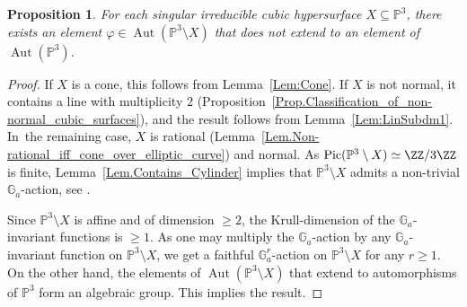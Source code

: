 \documentclass[JEP,XML,SOM,Unicode,NoFloatCountersInSection,published]{cedram}
\newtheorem{proposition}[lemma]{Proposition}
\theoremstyle{definition}
\newcommand\p{{\mathbb P}}\let\PP\p
\newcommand\GG{{\mathbb G}}
\DeclareMathOperator{\Aut}{Aut}
\DeclareMathOperator{\Pic}{Pic}
\begin{document}
\begin{proposition}\label{Prop:SingCubic}
For each singular irreducible cubic hypersurface $X\subseteq \p^3$, there exists an element $\varphi\in \Aut(\p^3\setminus X)$ that does not extend to an element of $\Aut(\p^3)$.
\end{proposition}
\begin{proof}
If $X$ is a cone, this follows from Lemma~\ref{Lem:Cone}. If $X$ is not normal, it contains a line with multiplicity $2$ (Proposition~\ref{Prop.Classification_of_non-normal_cubic_surfaces}), and the result follows from Lemma~\ref{Lem:LinSubdm1}. In~the remaining case, $X$ is rational (Lemma~\ref{Lem.Non-rational_iff_cone_over_elliptic_curve}) and normal.
As $\Pic(\PP^3 \setminus X) \simeq \ZZ/3\ZZ$ is finite,
Lemma~\ref{Lem.Contains_Cylinder}
implies that $\PP^3 \setminus X$ admits a non-trivial $\GG_a$-action, see \eg \cite[Prop.\,2]{DuKi2015Log-uniruled-affin}.

Since $\PP^3 \setminus X$
is affine and of dimension $\geq 2$, the Krull-dimension of the
$\GG_a$-invariant functions is $\geq 1$.
As one may multiply the $\GG_a$-action by any $\GG_a$-invariant function on
$\PP^3 \setminus X$, we get a faithful $\GG_a^r$-action on
$\PP^3 \setminus X$ for any $r \geq 1$. On the other hand, the elements
of $\Aut(\PP^3 \setminus X)$ that extend to automorphisms of $\PP^3$ form
an algebraic group.
This implies the result.
\end{proof}

\backmatter


\end{document}
